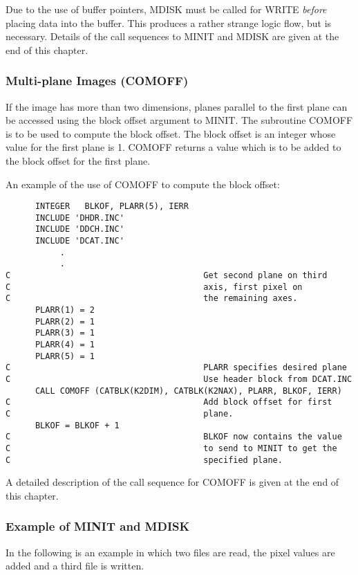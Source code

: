 Due to the use of buffer pointers, MDISK must be called for WRITE
{\it before}  placing data into the buffer.  This produces a rather
strange logic flow, but is necessary.  Details of the call sequences
to MINIT and MDISK are given at the end of this chapter.

\subsubsection{Multi-plane Images (COMOFF)}
If the image has more than two dimensions,  planes parallel to the
first plane can be accessed using the block offset argument to MINIT.
The subroutine COMOFF is to be used to compute the block offset.
The block offset is an integer whose value for the first plane is 1.
COMOFF returns a value which is to be added to the block offset for
the first plane.

An example of the use of COMOFF  to compute the block offset:
\begin{verbatim}
      INTEGER   BLKOF, PLARR(5), IERR
      INCLUDE 'DHDR.INC'
      INCLUDE 'DDCH.INC'
      INCLUDE 'DCAT.INC'
           .
           .
C                                       Get second plane on third
C                                       axis, first pixel on
C                                       the remaining axes.
      PLARR(1) = 2
      PLARR(2) = 1
      PLARR(3) = 1
      PLARR(4) = 1
      PLARR(5) = 1
C                                       PLARR specifies desired plane
C                                       Use header block from DCAT.INC
      CALL COMOFF (CATBLK(K2DIM), CATBLK(K2NAX), PLARR, BLKOF, IERR)
C                                       Add block offset for first
C                                       plane.
      BLKOF = BLKOF + 1
C                                       BLKOF now contains the value
C                                       to send to MINIT to get the
C                                       specified plane.

\end{verbatim}
A detailed description of the call sequence for COMOFF is given at
the end of this chapter.

\subsubsection{Example of MINIT and MDISK}
In the following is an example in which two files are read, the pixel
values are added and a third file is written.

